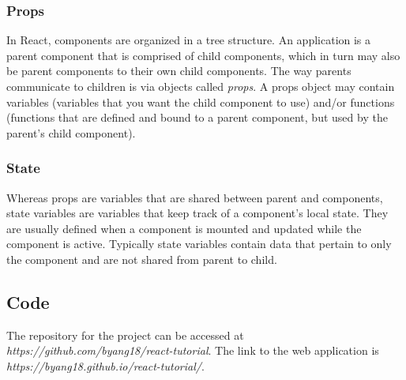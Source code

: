 \documentclass[11pt]{article}
\begin{document}
\subsubsection*{Props}

In React, components are organized in a tree structure. An application is a parent component that is comprised of child components, which in turn may also be parent components to their own child components. The way parents communicate to children is via objects called \textit{props}. A props object may contain variables (variables that you want the child component to use) and/or functions (functions that are defined and bound to a parent component, but used by the parent's child component).

\subsubsection*{State}

Whereas props are variables that are shared between parent and components, state variables are variables that keep track of a component's local state. They are usually defined when a component is mounted and updated while the component is active. Typically state variables contain data that pertain to only the component and are not shared from parent to child.

\subsection*{Code}

The repository for the project can be accessed at \textit{https://github.com/byang18/react-tutorial}. The link to the web application is \textit{https://byang18.github.io/react-tutorial/}.



%
%
\newpage


\end{document}
